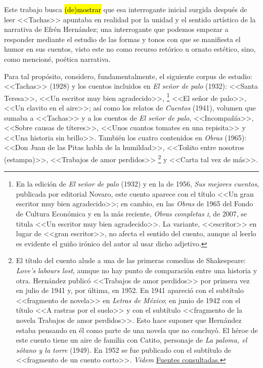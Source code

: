 \documentclass[14pt,twoside,final]{extbook} %
\let\oldfootnote\footnote
\renewcommand\footnote[1]{%
\oldfootnote{\hspace{1mm}#1}}
\begin{document}
Este trabajo busca \hl{(de)mostrar} que esa interrogante inicial surgida después de leer <<Tachas>> apuntaba en realidad por la unidad y el sentido artístico de la narrativa de Efrén Hernández; una interrogante que podemos empezar a responder mediante el estudio de las formas y tonos con que se manifiesta el humor en sus cuentos, visto este no como recurso retórico u ornato estético, sino, como mencioné, poética narrativa.

Para tal propósito, considero, fundamentalmente, el siguiente corpus de estudio: <<Tachas>> (1928) y los cuentos incluidos en \emph{El señor de palo} (1932): <<Santa Teresa>>, <<Un escritor muy bien agradecido>>,\footnote{En la edición de \emph{El señor de palo} (1932) y en la de 1956, \emph{Sus mejores cuentos}, publicada por editorial Novaro, este cuento aparece con el título <<Un gran escritor muy bien agradecido>>; en cambio, en las \emph{Obras} de 1965 del Fondo de Cultura Económica y en la más reciente, \emph{Obras completas \textsc{i}}, de 2007, se titula <<Un escritor muy bien agradecido>>. La variante, <<escritor>> en lugar de <<gran escritor>>, no afecta el sentido del cuento, aunque al leerlo es evidente el guiño irónico del autor al usar dicho adjetivo.} <<El señor de palo>>, <<Un clavito en el aire>>; así como los relatos de \emph{Cuentos} (1941), volumen que sumaba a <<Tachas>> y a los cuentos de \emph{El señor de palo}, <<Incompañía>>, <<Sobre causas de títeres>>, <<Unos cuantos tomates en una repisita>> y <<Una historia sin brillo>>. También los cuatro contenidos en \emph{Obras} (1965): <<Don Juan de las Pitas habla de la humildad>>, <<Toñito entre nosotros (estampa)>>, <<Trabajos de amor perdidos>>\footnote{El título del cuento alude a una de las primeras comedias de Shakespeare: \emph{Love's labours lost}, aunque no hay punto de comparación entre una historia y otra. Hernández publicó <<Trabajos de amor perdidos>> por primera vez en julio de 1941 y, por última, en 1952. En 1941 apareció con el subtítulo <<fragmento de novela>> en \emph{Letras de México}; en junio de 1942 con el título <<A rastras por el suelo>> y con el subtítulo <<fragmento de la novela Trabajos de amor perdidos>>. Esto hace suponer que Hernández estaba pensando en él como parte de una novela que no concluyó. El héroe de este cuento tiene un aire de familia con Catito, personaje de \emph{La paloma, el sótano y la torre} (1949). En 1952 se fue publicado con el subtítulo de <<fragmento de un cuento corto>>. \emph{Videm} \hyperref[bib:hernandez1952]{Fuentes consultadas.}} y <<Carta tal vez de más>>.
\end{document}
